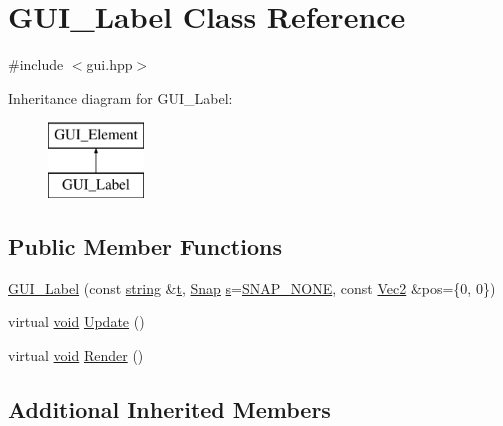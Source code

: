 \hypertarget{class_g_u_i___label}{\section{G\-U\-I\-\_\-\-Label Class Reference}
\label{class_g_u_i___label}
}


{\ttfamily \#include $<$gui.\-hpp$>$}

Inheritance diagram for G\-U\-I\-\_\-\-Label\-:\begin{figure}[H]
\begin{center}
\leavevmode
\includegraphics[height=2.000000cm]{class_g_u_i___label}
\end{center}
\end{figure}
\subsection*{Public Member Functions}
\begin{DoxyCompactItemize}
\item 
\hyperlink{class_g_u_i___label_ae897a315d83658024a79de8d63562945}{G\-U\-I\-\_\-\-Label} (const \hyperlink{_s_d_l__opengl__glext_8h_ae84541b4f3d8e1ea24ec0f466a8c568b}{string} \&\hyperlink{_s_d_l__opengl_8h_a7d65d00ca3b0630d9b5c52df855b19f5}{t}, \hyperlink{gui_8hpp_a783fc9ada177ee80c2fc73bc2e488bc0}{Snap} \hyperlink{_s_d_l__opengl_8h_a4af680a6c683f88ed67b76f207f2e6e4}{s}=\hyperlink{gui_8hpp_a783fc9ada177ee80c2fc73bc2e488bc0ab47624cb228d9afb43c71d3c4e5caf33}{S\-N\-A\-P\-\_\-\-N\-O\-N\-E}, const \hyperlink{class_vec2}{Vec2} \&pos=\{0, 0\})
\item 
virtual \hyperlink{_s_d_l__opengles2__gl2ext_8h_ae5d8fa23ad07c48bb609509eae494c95}{void} \hyperlink{class_g_u_i___label_a139decbab557724d3c3e99eea955b4dd}{Update} ()
\item 
virtual \hyperlink{_s_d_l__opengles2__gl2ext_8h_ae5d8fa23ad07c48bb609509eae494c95}{void} \hyperlink{class_g_u_i___label_a8dc90f9d0f2866e74c182473aae94c74}{Render} ()
\end{DoxyCompactItemize}
\subsection*{Additional Inherited Members}


